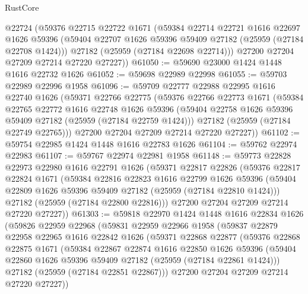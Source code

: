 \begin{lexlean}{RustCore}
\begin{coremodule}
      @22724
      (@59376
        @22715
        @22722
        @1671
        (@59384
          @22714
          @22721
          @1616
          @22697
          @1626
          @59396
          (@59404 @22707 @1626 @59396 @59409 @27182 (@25959 (@27184 @22708 @1424)))
          @27182
          (@25959 (@27184 @22698 @22714)))
        @27200
        @27204
        @27209
        @27214
        @27220
        @27227))
@61050 := @59690 @23000 @1424 @1448 @1616 @22732 @1626
@61052 := @59698 @22989 @22998
@61055 := @59703 @22989 @22996 @1958
@61096 := @59709
    @22777
    @22988
    @22995
    @1616
    @22740
    @1626
    (@59371
      @22766
      @22775
      (@59376
        @22766
        @22773
        @1671
        (@59384
          @22765
          @22772
          @1616
          @22748
          @1626
          @59396
          (@59404 @22758 @1626 @59396 @59409 @27182 (@25959 (@27184 @22759 @1424)))
          @27182
          (@25959 (@27184 @22749 @22765)))
        @27200
        @27204
        @27209
        @27214
        @27220
        @27227))
@61102 := @59754 @22985 @1424 @1448 @1616 @22783 @1626
@61104 := @59762 @22974 @22983
@61107 := @59767 @22974 @22981 @1958
@61148 := @59773
    @22828
    @22973
    @22980
    @1616
    @22791
    @1626
    (@59371
      @22817
      @22826
      (@59376
        @22817
        @22824
        @1671
        (@59384
          @22816
          @22823
          @1616
          @22799
          @1626
          @59396
          (@59404 @22809 @1626 @59396 @59409 @27182 (@25959 (@27184 @22810 @1424)))
          @27182
          (@25959 (@27184 @22800 @22816)))
        @27200
        @27204
        @27209
        @27214
        @27220
        @27227))
@61303 := @59818
    @22970
    @1424
    @1448
    @1616
    @22834
    @1626
    (@59826
      @22959
      @22968
      (@59831
        @22959
        @22966
        @1958
        (@59837
          @22879
          @22958
          @22965
          @1616
          @22842
          @1626
          (@59371
            @22868
            @22877
            (@59376
              @22868
              @22875
              @1671
              (@59384
                @22867
                @22874
                @1616
                @22850
                @1626
                @59396
                (@59404 @22860 @1626 @59396 @59409 @27182 (@25959 (@27184 @22861 @1424)))
                @27182
                (@25959 (@27184 @22851 @22867)))
              @27200
              @27204
              @27209
              @27214
              @27220
              @27227))

\end{coremodule}
\end{lexlean}
